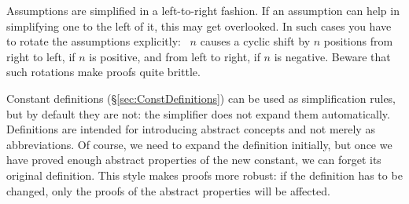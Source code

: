 \begin{isabellebody}
\begin{isamarkuptext}
\begin{warn}
Assumptions are simplified in a left-to-right fashion. If an
assumption can help in simplifying one to the left of it, this may get
overlooked. In such cases you have to rotate the assumptions explicitly:
\isa{{\isacharparenleft}}~$n$\isa{{\isacharparenright}}
causes a cyclic shift by $n$ positions from right to left, if $n$ is
positive, and from left to right, if $n$ is negative.
Beware that such rotations make proofs quite brittle.
\end{warn}%
\end{isamarkuptext}%
\isamarkuptrue%
%
\isamarkuptrue%
%
\begin{isamarkuptext}%
\label{sec:Simp-with-Defs}
Constant definitions (\S\ref{sec:ConstDefinitions}) can be used as
simplification rules, but by default they are not: the simplifier does not
expand them automatically.  Definitions are intended for introducing abstract
concepts and not merely as abbreviations.  Of course, we need to expand
the definition initially, but once we have proved enough abstract properties
of the new constant, we can forget its original definition.  This style makes
proofs more robust: if the definition has to be changed,
only the proofs of the abstract properties will be affected.


\end{isamarkuptext}
\end{isabellebody}
